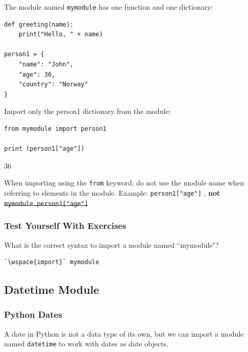 \documentclass[12pt,a4paper]{article}
\newcommand{\wspace}[1]{%
	\color{white}\colorbox{white}{\texttt{#1}}%
}
\newcommand{\code}[1]{%
	\colorbox{backcolour}{\lstinline{#1}}%
}
\newcommand{\lcode}[1]{%
	\lstinline{#1}%
}
\begin{document}
\begin{ebox}
The module named \lcode{mymodule} has one function
and one dictionary:
	\begin{lstlisting}
def greeting(name):
    print("Hello, " + name)

person1 = {
    "name": "John",
    "age": 36,
    "country": "Norway"
}
	\end{lstlisting}
\end{ebox}

\begin{ebox}
Import only the person1 dictionary from the module:
	\begin{lstlisting}
from mymodule import person1

print (person1["age"])
	\end{lstlisting}
\tcblower
	\begin{vercode}
36
	\end{vercode}
\end{ebox}

\begin{nbox}
When importing using the \lcode{from} keyword,
do not use the module name when
referring to elements in the module. Example:
\lcode{person1["age"]}, \textbf{not}
\sout{\lcode{mymodule.person1["age"]}}
\end{nbox}
\subsubsection{Test Yourself With Exercises}

\begin{tbox}
What is the correct syntax to import a module named ``mymodule"?
	\begin{lstlisting}[numbers=none]
`\wspace{import}` mymodule
	\end{lstlisting}
\end{tbox}
\subsection{Datetime Module}

\subsubsection{Python Dates}

A date in Python is not a data type of its own, but we can import a module
named \code{datetime} to work with dates as date objects.
\end{document}
